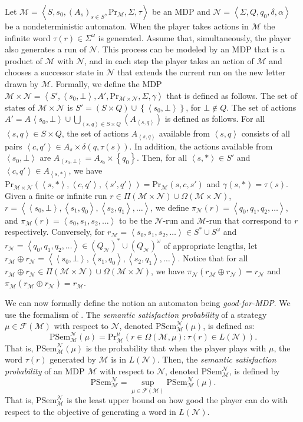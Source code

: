 \documentclass[10pt,a4paper]{amsart}
\theoremstyle{definition}
\numberwithin{equation}{section}
\newcommand{\set}[1]{\{ #1 \}}
\newcommand{\M}{{\mathcal M}}
\newcommand{\F}{{\mathcal F}}
\newcommand{\zug}[1]{\left\langle #1 \right\rangle}
\renewcommand{\set}[1]{\left\{ #1 \right\}}
\renewcommand{\Pr}{\mathrm{Pr}}
\newcommand{\N}{{\mathcal N}}
\begin{document}
Let $\M=\zug{S,s_0,(A_s)_{s\in S},\Pr_\M,\Sigma,\tau}$ be an MDP and $\N=\zug{\Sigma,Q,q_0,\delta,\alpha}$ be a nondeterministic automaton. When the player takes actions in $\M$ the infinite word $\tau(r)\in \Sigma^\omega$ is generated. Assume that, simultaneously, the player also generates a run of $\N$. This process can be modeled by an MDP that is a product of $\M$ with $\N$, and in each step the player takes an action of $\M$ and chooses a successor state in $\N$ that extends the current run on the new letter drawn by $\M$. Formally, we define the MDP $\M\times \N=\zug{S',\zug{s_0,\bot},A',\Pr_{\M\times \N},\Sigma,\gamma}$ that is defined as follows. The set of states of $\M\times \N$ is $S'=(S\times Q)\cup \set{\zug{s_0,\bot}}$, for $\bot\notin Q$. The set of actions $A'=A_{}\zug{s_0,\bot}\cup \bigcup_{\zug{s,q}\in S\times Q}(A_{\zug{s,q}})$ is defined as follows. For all $\zug{s,q}\in S\times Q$, the set of actions $A_{\zug{s,q}}$ available from $\zug{s,q}$ consists of all pairs $\zug{c,q'}\in A_s\times \delta(q,\tau(s))$. In addition, the actions available from $\zug{s_0,\bot}$ are $A_{\zug{s_0,\bot}}=A_{s_0}\times \set{q_0}$. Then, for all $\zug{s,\ast}\in S'$ and $\zug{c,q'}\in A_{\zug{s,\ast}}$, we have $\Pr_{\M\times \N}(\zug{s,\ast},\zug{c,q'},\zug{s',q'})=\Pr_{\M}(s,c,s')$ and $\gamma(s,\ast)=\tau(s)$.
Given a finite or infinite run $r\in \Pi(\M\times \N)\cup \Omega(\M\times \N)$, $r=\zug{\zug{s_0,\bot},\zug{s_1,q_0},\zug{s_2,q_1},\ldots}$, we define $\pi_\N(r)=\zug{q_0,q_1,q_2,\ldots}$, and $\pi_\M(r)=\zug{s_0,s_1,s_2,\ldots}$ to be the $\N$-run and $\M$-run that correspond to $r$ respectively. Conversely, for $r_\M=\zug{s_0,s_1,s_2,\ldots}\in S^*\cup S^\omega$ and $r_\N=\zug{q_0,q_1,q_2,\ldots}\in (Q_\N)^*\cup (Q_\N)^\omega$ 
of appropriate lengths, let $r_\M\oplus r_\N=\zug{\zug{s_0,\bot},\zug{s_1,q_0},\zug{s_2,q_1},\ldots}$. Notice that for all $r_\M\oplus r_\N\in \Pi(\M\times \N)\cup \Omega(\M\times \N)$, we have $\pi_\N(r_\M\oplus r_\N)=r_\N$ and $\pi_\M(r_\M\oplus r_\N)=r_\M$.

We can now formally define the notion an automaton being \emph{good-for-MDP}. We use the formalism of \cite{HPSSTWW20}.
The \emph{semantic satisfaction probability\/} of a strategy $\mu\in \F(\M)$ with respect to $\N$, denoted $\mathrm{PSem}^\N_\M(\mu)$, is defined as:
\[
\mathrm{PSem}^\N_\M(\mu)={\Pr}_\M^\mu(r\in \Omega(\M,\mu) : \tau(r)\in L(\N)).
\]
That is, $\mathrm{PSem}^\N_\M(\mu)$ is the probability that when the player plays with $\mu$, the word $\tau(r)$ generated by $\M$ is in $L(\N)$. 
Then, the \emph{semantic satisfaction probability} of an MDP $\M$ with respect to $\N$, denoted $\mathrm{PSem}^\N_\M$, is defined by
\[
\mathrm{PSem}^\N_\M=\sup_{\mu\in \F(\M)}\mathrm{PSem}^\N_\M(\mu).
\]
That is, $\mathrm{PSem}^\N_\M$ is the least upper bound on how good the player can do with respect to the objective of generating a word in $L(\N)$. 
\end{document}
